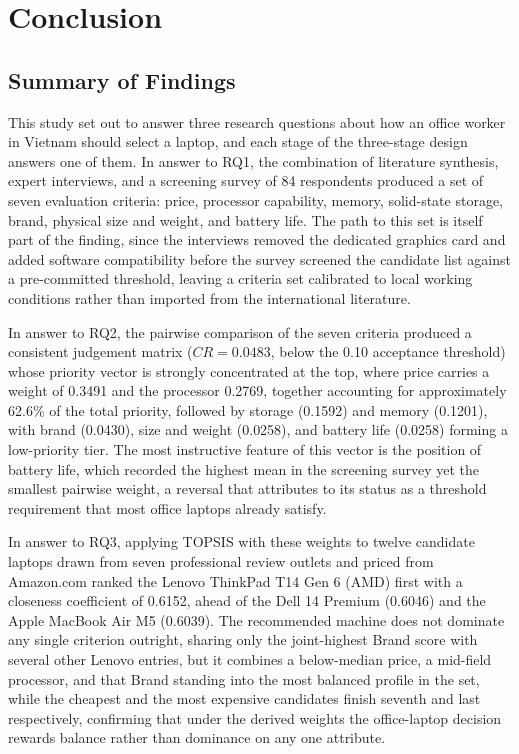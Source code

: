 \chapter{Conclusion}\label{ch:conclusion}


\section{Summary of Findings}\label{sec:summary}

This study set out to answer three research questions about how an office worker in
Vietnam should select a laptop, and each stage of the three-stage design answers one of
them. In answer to RQ1, the combination of literature synthesis, expert interviews, and a
screening survey of 84 respondents produced a set of seven evaluation criteria: price,
processor capability, memory, solid-state storage, brand, physical size and weight, and
battery life. The path to this set is itself part of the finding, since the interviews
removed the dedicated graphics card and added software compatibility before the survey
screened the candidate list against a pre-committed threshold, leaving a criteria set
calibrated to local working conditions rather than imported from the international
literature.

In answer to RQ2, the pairwise comparison of the seven criteria produced a consistent
judgement matrix ($CR = 0.0483$, below the 0.10 acceptance threshold) whose priority
vector is strongly concentrated at the top, where price carries a weight of 0.3491 and the
processor 0.2769, together accounting for approximately 62.6\% of the total priority,
followed by storage (0.1592) and memory (0.1201), with brand (0.0430), size and weight
(0.0258), and battery life (0.0258) forming a low-priority tier. The most instructive
feature of this vector is the position of battery life, which recorded the highest mean
in the screening survey yet the smallest pairwise weight, a reversal that
 attributes to its status as a threshold requirement that most office
laptops already satisfy.

In answer to RQ3, applying TOPSIS with these weights to twelve candidate laptops drawn
from seven professional review outlets and priced from Amazon.com ranked the Lenovo
ThinkPad T14 Gen 6 (AMD) first with a closeness coefficient of 0.6152, ahead of the Dell
14 Premium (0.6046) and the Apple MacBook Air M5 (0.6039). The recommended machine does
not dominate any single criterion outright, sharing only the joint-highest Brand score
with several other Lenovo entries, but it combines a below-median price, a mid-field
processor, and that Brand standing into the most balanced profile in the set, while the
cheapest and the most expensive candidates finish seventh and last respectively,
confirming that under the derived weights the office-laptop decision rewards balance
rather than dominance on any one attribute.


